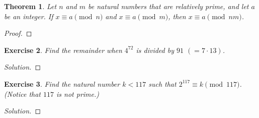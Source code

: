 \documentclass[12pt,leqno]{article}
\numberwithin{equation}{section}
\newtheorem{thm}{Theorem}[section]
\newtheorem{exer}[thm]{Exercise}
\theoremstyle{definition}
\begin{document}
\begin{thm}
Let $n$ and $m$ be natural numbers that are relatively prime, and
let $a$ be an integer.  If $x \equiv a \pmod{n}$ and $x \equiv a
\pmod{m}$, then $x \equiv a \pmod{nm}$.
\end{thm}
\begin{proof}[Proof]
\end{proof}

\begin{exer}
Find the remainder when $4^{72}$ is divided by $91$ $(=7\cdot 13)$.
\end{exer}
\begin{proof}[Solution]
\end{proof}


\begin{exer}
Find the natural number $k < 117$ such that $2^{117} \equiv k
\pmod{117}$. (Notice that $117$ is not prime.)
\end{exer}
\begin{proof}[Solution]
\end{proof}
\end{document}
